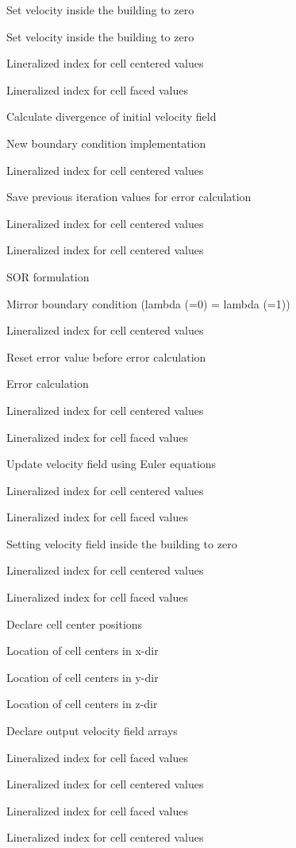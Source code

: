 Set velocity inside the building to zero

Set velocity inside the building to zero

Lineralized index for cell centered values

Lineralized index for cell faced values

Calculate divergence of initial velocity field

New boundary condition implementation

Lineralized index for cell centered values

Save previous iteration values for error calculation

Lineralized index for cell centered values

Lineralized index for cell centered values

S\+OR formulation

Mirror boundary condition (lambda (=0) = lambda (=1))

Lineralized index for cell centered values

Reset error value before error calculation

Error calculation

Lineralized index for cell centered values

Lineralized index for cell faced values

Update velocity field using Euler equations

Lineralized index for cell centered values

Lineralized index for cell faced values

Setting velocity field inside the building to zero

Lineralized index for cell centered values

Lineralized index for cell faced values

Declare cell center positions

Location of cell centers in x-\/dir

Location of cell centers in y-\/dir

Location of cell centers in z-\/dir

Declare output velocity field arrays

Lineralized index for cell faced values

Lineralized index for cell centered values

Lineralized index for cell faced values

Lineralized index for cell centered values

